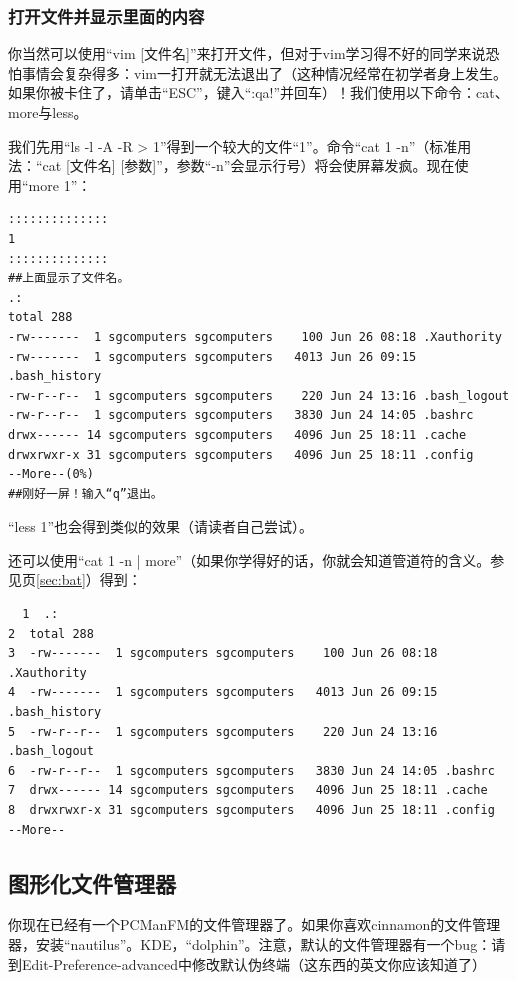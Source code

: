 \documentclass{book}
\begin{document}
\subsubsection{打开文件并显示里面的内容}
你当然可以使用“vim [文件名]”来打开文件，但对于vim学习得不好的同学来说恐怕事情会复杂得多：vim一打开就无法退出了（这种情况经常在初学者身上发生。如果你被卡住了，请单击“ESC”，键入“:qa!”并回车）！我们使用以下命令：cat、more与less。\par
我们先用“ls -l -A -R > 1”得到一个较大的文件“1”。命令“cat 1 -n”（标准用法：“cat [文件名] [参数]”，参数“-n”会显示行号）将会使屏幕发疯。现在使用“more 1”：
\begin{verbatim}
::::::::::::::
1
::::::::::::::
##上面显示了文件名。
.:
total 288
-rw-------  1 sgcomputers sgcomputers    100 Jun 26 08:18 .Xauthority
-rw-------  1 sgcomputers sgcomputers   4013 Jun 26 09:15 .bash_history
-rw-r--r--  1 sgcomputers sgcomputers    220 Jun 24 13:16 .bash_logout
-rw-r--r--  1 sgcomputers sgcomputers   3830 Jun 24 14:05 .bashrc
drwx------ 14 sgcomputers sgcomputers   4096 Jun 25 18:11 .cache
drwxrwxr-x 31 sgcomputers sgcomputers   4096 Jun 25 18:11 .config
--More--(0%)
##刚好一屏！输入“q”退出。
\end{verbatim}
“less 1”也会得到类似的效果（请读者自己尝试）。\par
还可以使用“cat 1 -n | more”（如果你学得好的话，你就会知道管道符的含义。参见\pageref{sec:bat}页\ref{sec:bat}）得到：
\begin{verbatim}
  1  .:
2  total 288
3  -rw-------  1 sgcomputers sgcomputers    100 Jun 26 08:18 .Xauthority
4  -rw-------  1 sgcomputers sgcomputers   4013 Jun 26 09:15 .bash_history
5  -rw-r--r--  1 sgcomputers sgcomputers    220 Jun 24 13:16 .bash_logout
6  -rw-r--r--  1 sgcomputers sgcomputers   3830 Jun 24 14:05 .bashrc
7  drwx------ 14 sgcomputers sgcomputers   4096 Jun 25 18:11 .cache
8  drwxrwxr-x 31 sgcomputers sgcomputers   4096 Jun 25 18:11 .config
--More--
\end{verbatim}
\subsection{图形化文件管理器}
你现在已经有一个PCManFM的文件管理器了。如果你喜欢cinnamon的文件管理器，安装“nautilus”。KDE，“dolphin”。注意，默认的文件管理器有一个bug：请到Edit-Preference-advanced中修改默认伪终端（这东西的英文你应该知道了）
\end{document}
